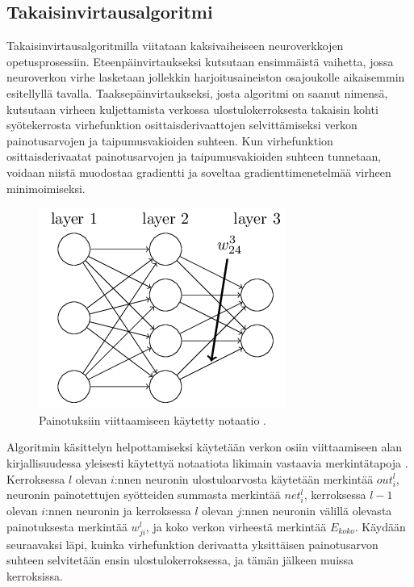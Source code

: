 \documentclass[finnish]{tktltiki2}
\theoremstyle{definition}
\theoremstyle{remark}
\begin{document}


  \subsection{Takaisinvirtausalgoritmi}
    Takaisinvirtausalgoritmilla viitataan kaksivaiheiseen neuroverkkojen opetusprosessiin. Eteenpäinvirtaukseksi kutsutaan ensimmäistä vaihetta, jossa neuroverkon virhe lasketaan jollekkin harjoitusaineiston osajoukolle aikaisemmin esitellyllä tavalla. Taaksepäinvirtaukseksi, josta algoritmi on saanut nimensä, kutsutaan virheen kuljettamista verkossa ulostulokerroksesta takaisin kohti syötekerrosta virhefunktion osittaisderivaattojen selvittämiseksi verkon painotusarvojen ja taipumusvakioiden suhteen. Kun virhefunktion osittaisderivaatat painotusarvojen ja taipumusvakioiden suhteen tunnetaan, voidaan niistä muodostaa gradientti ja soveltaa gradienttimenetelmää virheen minimoimiseksi.

    \begin{figure}[h]
      \centering
      \includegraphics[scale=0.4]{neuron-notation}
      \caption{Painotuksiin viittaamiseen käytetty notaatio \cite{Nielsen-neural}.}
      \label{pic:chain-rule}
    \end{figure}

    Algoritmin käsittelyn helpottamiseksi käytetään verkon osiin viittaamiseen alan kirjallisuudessa yleisesti käytettyä notaatiota likimain vastaavia merkintätapoja \cite{Nielsen-neural}\cite{Rojas96}. Kerroksessa $l$ olevan $i$:nnen neuronin ulostuloarvosta käytetään merkintää $out_i^l$, neuronin painotettujen syötteiden summasta merkintää $net_i^l$, kerroksessa $l-1$ olevan $i$:nnen neuronin ja kerroksessa $l$ olevan $j$:nnen neuronin välillä olevasta painotuksesta merkintää $w_{ji}^l$, ja koko verkon virheestä merkintää $E_{koko}$. Käydään seuraavaksi läpi, kuinka virhefunktion derivaatta yksittäisen painotusarvon suhteen selvitetään ensin ulostulokerroksessa, ja tämän jälkeen muissa kerroksissa.
\end{document}
